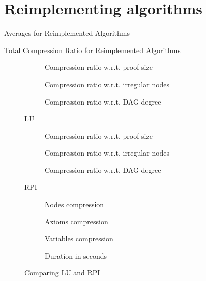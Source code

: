 \section{Reimplementing algorithms}
\begin{table}[hbt]
  \centering
  \caption{Averages for Reimplemented Algorithms}
\end{table}
\begin{table}[hbt]
  \centering
  \caption{Total Compression Ratio for Reimplemented Algorithms}
\end{table}
\begin{figure}[hbt]
  \begin{subfigure}{\textwidth}
    \centering
    \caption{Compression ratio w.r.t. proof size}
  \end{subfigure}
  \begin{subfigure}{\textwidth}
    \centering
    \caption{Compression ratio w.r.t. irregular nodes}
  \end{subfigure}
  \begin{subfigure}{\textwidth}
    \centering
    \caption{Compression ratio w.r.t. DAG degree}
  \end{subfigure}
  \caption{LU}
\end{figure}
\begin{figure}[hbt]
  \begin{subfigure}{\textwidth}
    \centering
    \caption{Compression ratio w.r.t. proof size}
  \end{subfigure}
  \begin{subfigure}{\textwidth}
    \centering
    \caption{Compression ratio w.r.t. irregular nodes}
  \end{subfigure}
  \begin{subfigure}{\textwidth}
    \centering
    \caption{Compression ratio w.r.t. DAG degree}
  \end{subfigure}
  \caption{RPI}
\end{figure}
\begin{figure}[hbt]
  \begin{subfigure}{0.5\textwidth}
    \centering
    \caption{Nodes compression}
  \end{subfigure}
  \begin{subfigure}{0.5\textwidth}
    \centering
    \caption{Axioms compression}
  \end{subfigure}
  \begin{subfigure}{0.5\textwidth}
    \centering
    \caption{Variables compression}
  \end{subfigure}
  \begin{subfigure}{0.5\textwidth}
    \centering
    \caption{Duration in seconds}
  \end{subfigure}
  \caption{Comparing LU and RPI}
\end{figure}
